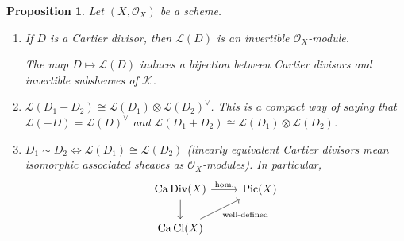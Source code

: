 \documentclass[12pt]{article}
\DeclareMathOperator{\Pic}{Pic}
\DeclareMathOperator{\Div}{Div}
\DeclareMathOperator{\Cl}{Cl}
\DeclareMathOperator{\Ca}{Ca}
\newtheorem*{proposition}{Proposition}
\theoremstyle{definition}
\theoremstyle{remark}
\begin{document}
\begin{proposition}
Let $(X,\mathcal{O}_X)$ be a scheme.

\begin{enumerate}[label=\roman*)]
\item If $D$ is a Cartier divisor, then $\mathcal{L}(D)$ is an invertible $\mathcal{O}_X$-module.

The map $D\mapsto\mathcal{L}(D)$ induces a bijection between Cartier divisors and invertible subsheaves of $\mathcal{K}$.

\item\label{menos_dual} $\mathcal{L}(D_1-D_2)\cong\mathcal{L}(D_1)\otimes\mathcal{L}(D_2)^{\vee}$. This is a compact way of saying that $\mathcal{L}(-D)=\mathcal{L}(D)^{\vee}$ and $\mathcal{L}(D_1+D_2)\cong\mathcal{L}(D_1)\otimes\mathcal{L}(D_2)$.

\item $D_1\sim D_2\Leftrightarrow\mathcal{L}(D_1)\cong\mathcal{L}(D_2)$ (linearly equivalent Cartier divisors mean isomorphic associated sheaves as $\mathcal{O}_X$-modules). In particular,
\[
\begin{tikzcd}
\Ca\Div(X)\arrow[r,"\text{hom.}"]\arrow[d]&\Pic(X)\\
\Ca\Cl(X)\arrow[ru,"\text{well-defined}",swap]
\end{tikzcd}
\]
\end{enumerate}
\end{proposition}
\end{document}
